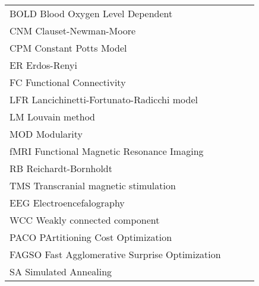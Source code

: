\begin{longtable}{@{}*{4}{p{\textwidth}@{}}}
BOLD \quad {\color{gray!50}\hrulefill} \quad  Blood Oxygen Level Dependent \\
CNM \quad {\color{gray!50}\hrulefill} \quad  Clauset-Newman-Moore \\
CPM \quad {\color{gray!50}\hrulefill} \quad  Constant Potts Model \\
ER \quad {\color{gray!50}\hrulefill} \quad  Erdos-Renyi \\
FC \quad {\color{gray!50}\hrulefill} \quad  Functional Connectivity \\
LFR \quad {\color{gray!50}\hrulefill} \quad  Lancichinetti-Fortunato-Radicchi model \\
LM \quad {\color{gray!50}\hrulefill} \quad  Louvain method \\
MOD \quad {\color{gray!50}\hrulefill} \quad  Modularity \\
fMRI \quad {\color{gray!50}\hrulefill} \quad  Functional Magnetic Resonance Imaging \\
RB \quad {\color{gray!50}\hrulefill} \quad  Reichardt-Bornholdt \\
TMS \quad {\color{gray!50}\hrulefill} \quad  Transcranial magnetic stimulation \\
EEG \quad {\color{gray!50}\hrulefill} \quad  Electroencefalography \\
WCC \quad {\color{gray!50}\hrulefill} \quad  Weakly connected component \\
PACO \quad {\color{gray!50}\hrulefill} \quad  PArtitioning Cost Optimization \\
FAGSO \quad {\color{gray!50}\hrulefill} \quad  Fast Agglomerative Surprise Optimization \\
SA \quad {\color{gray!50}\hrulefill} \quad  Simulated Annealing 
\end{longtable}

